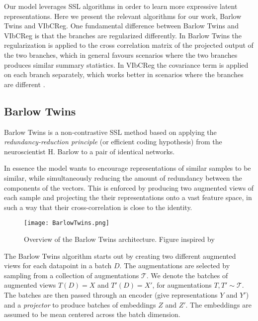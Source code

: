 \documentclass[../../thesis.tex]{subfiles}
\begin{document}
Our model leverages SSL algorithms in order to learn more expressive latent representations. Here we present the relevant algorithms for our work, Barlow Twins and VIbCReg.
\newline
One fundamental difference between Barlow Twins and VIbCReg is that the branches are regularized differently. In Barlow Twins the regularization is applied to the cross correlation matrix of the projected output of the two branches, which in general favours scenarios where the two branches produces similar summary statistics. In VIbCReg the covariance term is applied on each branch separately, which works better in scenarios where the branches are different \cite{bardes2022vicreg}.

\subsection{Barlow Twins}
Barlow Twins is a non-contrastive SSL method based on applying the \textit{redundancy-reduction principle} (or efficient coding hypothesis) \cite{Barlow_origin} from the neuroscientist H. Barlow to a pair of identical networks.\newline  

In essence the model wants to encourage representations of similar samples to be similar, while simultaneously reducing the amount of redundancy between the components of the vectors. This is enforced by producing two augmented views of each sample and projecting the their representations onto a vast feature space, in such a way that their cross-correlation is close to the identity. \newline

\begin{figure}[h]
    \texttt{[image: BarlowTwins.png]}
    \centering    
    \caption{Overview of the Barlow Twins architecture. Figure inspired by \cite{zbontar2021barlow}}
\end{figure}

The Barlow Twins algorithm starts out by creating two different augmented views for each datapoint in a batch $D$. The augmentations are selected by sampling from a collection of augmentations $\mathcal{T}$. We denote the batches of augmented views $T(D) = X$ and $T'(D) =X'$, for augmentations $T,T'\sim \mathcal{T}$.  The batches are then passed through an encoder (give representations $Y$ and $Y'$) and a \textit{projector} to produce batches of embeddings $Z$ and $Z'$. The embeddings are assumed to be mean centered across the batch dimension. \newline
\end{document}
